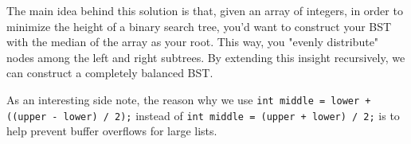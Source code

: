 \begin{blocksection}
\begin{solution}
The main idea behind this solution is that, given an array of integers, in order to minimize the
height of a binary search tree, you'd want to construct your BST with the median of the array as
your root. This way, you "evenly distribute" nodes among the left and right subtrees. By extending
this insight recursively, we can construct a completely balanced BST.

As an interesting side note, the reason why we use \lstinline{int middle = lower + ((upper - lower) / 2);} instead
of \lstinline{int middle = (upper + lower) / 2;} is to help prevent buffer overflows for large lists.
\end{solution}
\end{blocksection}
